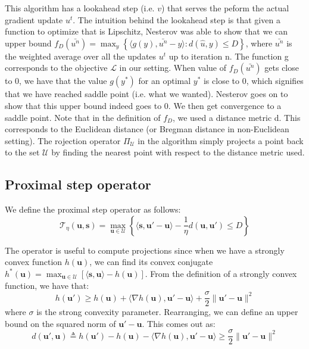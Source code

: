 \documentclass{article}
\renewcommand{\vec}{\mathbf}
\begin{document}
This algorithm has a lookahead step (i.e. $v$) that serves the peform the actual
gradient update $u^t$. The intuition behind the lookahead step is that given a
function to optimize that is Lipschitz, Nesterov was able to show that we can
upper bound $f_{D}(\bar{u^n}) = \max_y \left \{ \langle g(y),\bar{u^n} - y
\rangle : d(\hat{u},y) \leq D \right \}$, where $\bar{u^n}$ is the weighted
average over all the updates $u^t$ up to iteration n. The function g corresponds
to the objective $\mathcal{L}$ in our setting. When value of $f_D(\bar{u^n})$
gets close to 0, we have that the value $g(y^*)$ for an optimal $y^*$ is close
to 0, which signifies that we have reached saddle point (i.e. what we wanted).
Nesterov goes on to show that this upper bound indeed goes to 0. We then get
convergence to a saddle point. Note that in the definition of $f_D$, we used a
distance metric d. This corresponds to the Euclidean distance (or Bregman
distance in non-Euclidean setting). The rojection operator $\Pi_{\mathcal{U}}$
in the algorithm simply projects a point back to the set $\mathcal{U}$ by
finding the nearest point with respect to the distance metric used.

\subsection{Proximal step operator}
We define the proximal step operator as follows:
\begin{equation}
  \mathcal{T}_{\eta}(\vec u, \vec s) = \max_{\vec u \in \mathcal{U}} \left \{ \langle \vec s, \vec u' - \vec u \rangle - \frac{1}{\eta}  d(\vec u, \vec u') \leq D \right \}
\end{equation}

The operator is useful to compute projections since when we have a strongly convex function $h(\vec u)$, we can find its convex conjugate $h^*(\vec u) = \max_{\vec u  \in \mathcal{U}} \left [ \langle \vec s, \vec u \rangle - h(\vec u) \right ]$. From the definition of a strongly convex function, we have that:
\begin{equation}
  h(\vec u') \geq h(\vec u) + \langle \nabla h(\vec u), \vec u'  - \vec u \rangle + \frac{\sigma}{2} \lVert \vec u' - \vec u \rVert^2
\end{equation}
where $\sigma$ is the strong convexity parameter. Rearranging, we can define an upper bound on the squared norm of $\vec u' - \vec u$. This comes out as:
\begin{equation}
  d(\vec u', \vec u) \triangleq h(\vec u') - h(\vec u) - \langle \nabla h(\vec u), \vec u' - \vec u \rangle \geq \frac{\sigma}{2} \lVert \vec u' - \vec u \rVert^2
\end{equation}
\end{document}
